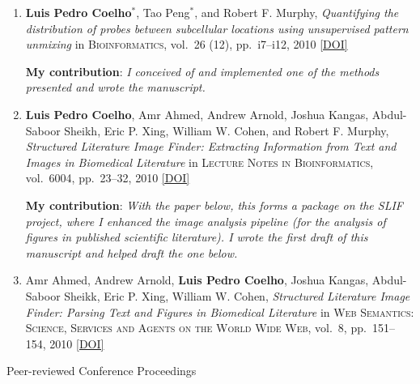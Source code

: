 \documentclass{article}
\renewcommand\subsection[1]{%
    \par\vspace{.1em}%
    {\hspace{1em}\subsubhead #1}%
    \par\vspace{.2em}%
}
\newcommand\showdoi[1]{%
    \href{http://dx.doi.org/#1}{[DOI]}%
}
\newcommand\pubname[1]{\textsc{#1}}
\newcommand\contribution[1]{\relax\hfill\break\textbf{My contribution}: \textit{#1}}
\newcommand\costar{${}^{*}$}
\begin{document}
\begin{enumerate}[resume]
\item \textbf{Luis Pedro Coelho}\costar, Tao Peng\costar, and Robert F.
Murphy, \emph{Quantifying the distribution of probes between subcellular
locations using unsupervised pattern unmixing} in \pubname{Bioinformatics},
vol.\ 26 (12), pp.\ i7--i12, 2010 \showdoi{10.1093/bioinformatics/btq220}
\contribution{I conceived of and implemented one of the methods presented and
wrote the manuscript.}

\item \textbf{Luis Pedro Coelho}, Amr Ahmed, Andrew Arnold, Joshua Kangas,
Abdul-Saboor Sheikh, Eric P. Xing, William W. Cohen, and Robert F. Murphy,
\emph{Structured Literature Image Finder: Extracting Information from Text and
Images in Biomedical Literature} in \pubname{Lecture Notes in Bioinformatics},
vol.\ 6004, pp.\ 23--32, 2010 \showdoi{10.1007/978-3-642-13131-8_4}
\contribution{With the paper below, this forms a package on the SLIF project,
where I enhanced the image analysis pipeline (for the analysis of figures in
published scientific literature). I wrote the first draft of this manuscript
and helped draft the one below.}

\item Amr Ahmed, Andrew Arnold, \textbf{Luis Pedro Coelho}, Joshua Kangas,
Abdul-Saboor Sheikk, Eric P. Xing, William W. Cohen, \emph{Structured
Literature Image Finder: Parsing Text and Figures in Biomedical Literature} in
\pubname{Web Semantics: Science, Services and Agents on the World Wide Web},
vol.\ 8, pp.\ 151--154, 2010 \showdoi{10.1016/j.websem.2010.04.002}
\end{enumerate}

\subsection{Peer-reviewed Conference Proceedings}
\end{document}
